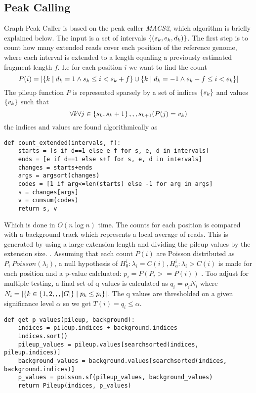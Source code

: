\subsection{Peak Calling}
Graph Peak Caller is based on the peak caller \emph{MACS2}, which algorithm is briefly explained below. 
The input is a set of intervals $\left\{(s_k, e_k, d_k)\right\}$. The first step is to count how many extended reads cover each position of the reference genome, where each interval is extended to a length equaling a previously estimated fragment length $f$. I.e for each position $i$ we want to find the count
$$P(i)= \left|\left\{k \mid d_k=1 \wedge s_k \leq i < s_k+f\right\} \cup \left\{k \mid d_k=-1 \wedge e_k-f \leq i < e_k\right\}\right|$$
  The pileup function $P$ is represented sparsely by a set of indices $\left\{s_k\right\}$ and values $\left\{v_k\right\}$ such that $$\forall{k}\forall{j\in\left\{s_k, s_k+1\right\},,,s_{k+1}}(P(j) = v_k)$$
  the indices and values are found algorithmically as
  \begin{lstlisting}
def count_extended(intervals, f):    
    starts = [s if d==1 else e-f for s, e, d in intervals]
    ends = [e if d==1 else s+f for s, e, d in intervals]
    changes = starts+ends
    args = argsort(changes)
    codes = [1 if arg<=len(starts) else -1 for arg in args]
    s = changes[args]
    v = cumsum(codes)
    return s, v
  \end{lstlisting}
  Which is done in $O(n \log n)$ time. The counts for each position is compared with a background track which represents a local average of reads. This is generated by using a large extension length and dividing the pileup values by the extension size.
  .
  Assuming that each count $P(i)$ are Poisson distributed as $P_i ~ Poisson(\lambda_i)$, a null hypothesis of $H_0^i: \lambda_i=C(i), H_a^i:\lambda_i>C(i)$ is made for each position and a p-value calcluated: $p_i = P(P_i>=P(i))$ . Too adjust for multiple testing, a final set of q values is calculated as $q_i = p_iN_i$ where $N_i = \left|\left\{k\in\left\{1, 2,,,\left|G\right|\right\} \mid p_k\leq p_i\right\}\right|$. The q values are thresholded on a given significance level $\alpha$ so we get $T(i) = q_i\leq \alpha$. 
  \begin{lstlisting}
def get_p_values(pileup, background):
    indices = pileup.indices + background.indices
    indices.sort()
    pileup_values = pileup.values[searchsorted(indices, pileup.indices)]
    background_values = background.values[searchsorted(indices, background.indices)]
    p_values = poisson.sf(pileup_values, background_values)
    return Pileup(indices, p_values)
  \end{lstlisting}

